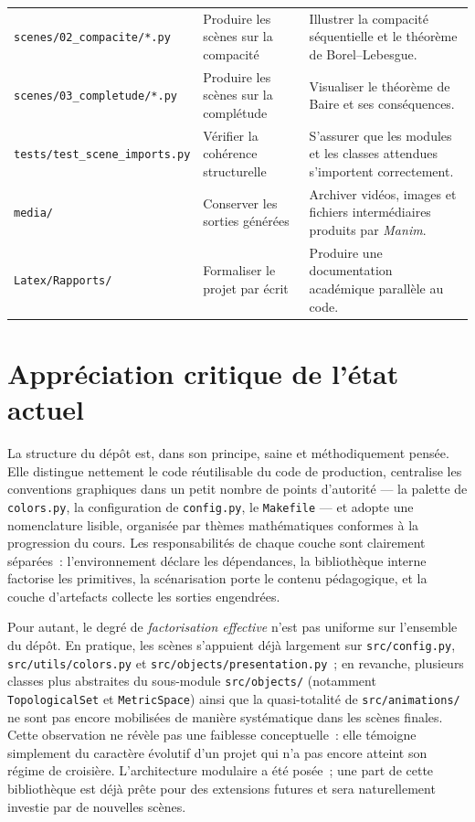 \documentclass[12pt, a4paper, openany]{report}
\begin{document}
\begin{longtable}{
		>{\raggedright\arraybackslash}p{4.1cm}
		>{\raggedright\arraybackslash}p{4.4cm}
		>{\raggedright\arraybackslash}p{5.2cm}
	}
		\texttt{scenes/02\_compacite/*.py} &
		Produire les scènes sur la compacité &
		Illustrer la compacité séquentielle et le théorème de Borel--Lebesgue. \\
		\texttt{scenes/03\_completude/*.py} &
		Produire les scènes sur la complétude &
		Visualiser le théorème de Baire et ses conséquences. \\
		\texttt{tests/test\_scene\_imports.py} &
		Vérifier la cohérence structurelle &
		S’assurer que les modules et les classes attendues s’importent correctement. \\
		\texttt{media/} &
		Conserver les sorties générées &
		Archiver vidéos, images et fichiers intermédiaires produits par \textit{Manim}. \\
		\texttt{Latex/Rapports/} &
		Formaliser le projet par écrit &
		Produire une documentation académique parallèle au code. \\
		\bottomrule
	\end{longtable}
	
	\section{Appréciation critique de l’état actuel}

	La structure du dépôt est, dans son principe, saine et méthodiquement pensée. Elle distingue nettement le code réutilisable du code de production, centralise les conventions graphiques dans un petit nombre de points d’autorité — la palette de \texttt{colors.py}, la configuration de \texttt{config.py}, le \texttt{Makefile} — et adopte une nomenclature lisible, organisée par thèmes mathématiques conformes à la progression du cours. Les responsabilités de chaque couche sont clairement séparées~: l’environnement déclare les dépendances, la bibliothèque interne factorise les primitives, la scénarisation porte le contenu pédagogique, et la couche d’artefacts collecte les sorties engendrées.

	Pour autant, le degré de \emph{factorisation effective} n’est pas uniforme sur l’ensemble du dépôt. En pratique, les scènes s’appuient déjà largement sur \texttt{src/config.py}, \texttt{src/utils/colors.py} et \texttt{src/objects/presentation.py}~; en revanche, plusieurs classes plus abstraites du sous-module \texttt{src/objects/} (notamment \texttt{TopologicalSet} et \texttt{MetricSpace}) ainsi que la quasi-totalité de \texttt{src/animations/} ne sont pas encore mobilisées de manière systématique dans les scènes finales. Cette observation ne révèle pas une faiblesse conceptuelle~: elle témoigne simplement du caractère évolutif d’un projet qui n’a pas encore atteint son régime de croisière. L’architecture modulaire a été posée~; une part de cette bibliothèque est déjà prête pour des extensions futures et sera naturellement investie par de nouvelles scènes.
\end{document}
